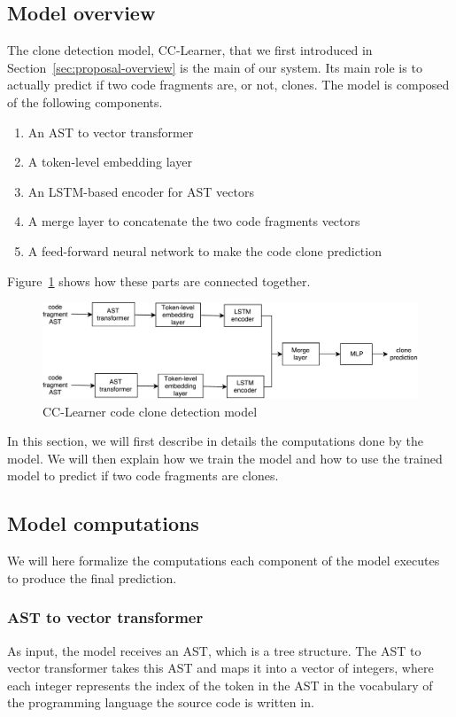 \subsection{Model overview}
The clone detection model, CC-Learner, that we first introduced in
Section~\ref{sec:proposal-overview} is the main of our system. Its main role is
to actually predict if two code fragments are, or not, clones. The model is
composed of the following components.
\begin{enumerate}
\item An AST to vector transformer
\item A token-level embedding layer
\item An LSTM-based encoder for AST vectors
\item A merge layer to concatenate the two code fragments vectors
\item A feed-forward neural network to make the code clone prediction
\end{enumerate}
%
Figure~\ref{fig:clone-detection-model} shows how these parts are connected
together.
%
\begin{figure}
  \centering\includegraphics[width=16cm]{./images/model-overview.pdf}
  \caption{\label{fig:clone-detection-model}CC-Learner code clone detection model}
\end{figure}
%
In this section, we will first describe in details the computations done by the
model. We will then explain how we train the model and how to use the trained
model to predict if two code fragments are clones.
%
\subsection{Model computations}
We will here formalize the computations each component of the model executes to
produce the final prediction.
\subsubsection{\label{sssec:ast-transformer} AST to vector transformer}
As input, the model receives an AST, which is a tree structure. The AST to
vector transformer takes this AST and maps it into a vector of integers, where
each integer represents the index of the token in the AST in the vocabulary of
the programming language the source code is written in.

